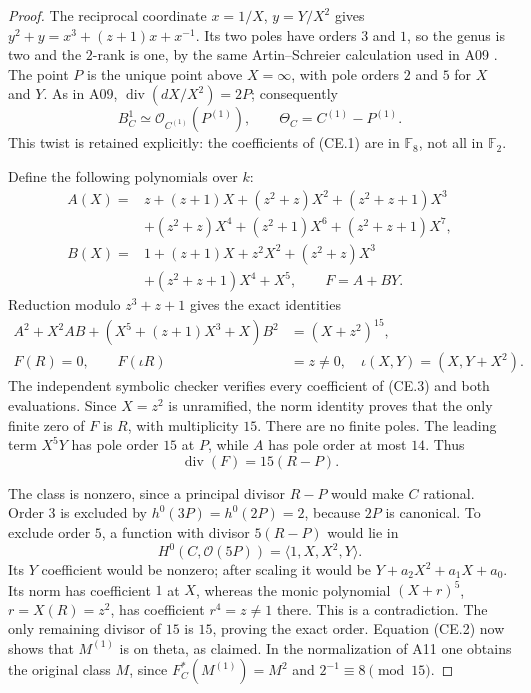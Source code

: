 \documentclass[11pt,a4paper]{article}
\begin{document}
\begin{proof}
The reciprocal coordinate $x=1/X$, $y=Y/X^2$ gives
$y^2+y=x^3+(z+1)x+x^{-1}$. Its two poles have orders $3$ and $1$,
so the genus is two and the $2$-rank is one, by the same
Artin--Schreier calculation used in A09
\cite[Lemma~2.6]{PriesZhu2012}. The point $P$ is the unique point
above $X=\infty$, with pole orders $2$ and $5$ for $X$ and $Y$.
As in A09, $\operatorname{div}(dX/X^2)=2P$; consequently
\[
 B^1_C\simeq\mathcal O_{C^{(1)}}(P^{(1)}),\qquad
 \Theta_C=C^{(1)}-P^{(1)}.
 \tag{CE.2}
\]
This twist is retained explicitly: the coefficients of (CE.1) are
in $\mathbb F_8$, not all in $\mathbb F_2$.

Define the following polynomials over $k$:
\begin{align*}
 A(X)={}&z+(z+1)X+(z^2+z)X^2+(z^2+z+1)X^3\\
        &+(z^2+z)X^4+(z^2+1)X^6+(z^2+z+1)X^7,\\
 B(X)={}&1+(z+1)X+z^2X^2+(z^2+z)X^3\\
        &+(z^2+z+1)X^4+X^5,\qquad F=A+BY.
\end{align*}
Reduction modulo $z^3+z+1$ gives the exact identities
\begin{align}
 A^2+X^2AB+(X^5+(z+1)X^3+X)B^2&=(X+z^2)^{15},
 \tag{CE.3}\\
 F(R)=0,\qquad F(\iota R)&=z\ne0,
 \quad\iota(X,Y)=(X,Y+X^2).
 \tag{CE.4}
\end{align}
The independent symbolic checker verifies every coefficient of
(CE.3) and both evaluations. Since $X=z^2$ is unramified, the norm
identity proves that the only finite zero of $F$ is $R$, with
multiplicity $15$. There are no finite poles. The leading term
$X^5Y$ has pole order $15$ at $P$, while $A$ has pole order at
most $14$. Thus
\[
                       \operatorname{div}(F)=15(R-P).
 \tag{CE.5}
\]

The class is nonzero, since a principal divisor $R-P$ would make
$C$ rational. Order $3$ is excluded by
$h^0(3P)=h^0(2P)=2$, because $2P$ is canonical. To exclude order
$5$, a function with divisor $5(R-P)$ would lie in
\[
 H^0(C,\mathcal O(5P))=\langle1,X,X^2,Y\rangle.
\]
Its $Y$ coefficient would be nonzero; after scaling it would be
$Y+a_2X^2+a_1X+a_0$. Its norm has coefficient $1$ at $X$, whereas
the monic polynomial $(X+r)^5$, $r=X(R)=z^2$, has coefficient
$r^4=z\ne1$ there. This is a contradiction. The only remaining
divisor of $15$ is $15$, proving the exact order. Equation (CE.2)
now shows that $M^{(1)}$ is on theta, as claimed. In the normalization
of A11 one obtains the original class $M$, since
$F_C^*(M^{(1)})=M^2$ and $2^{-1}\equiv8\pmod{15}$.


\end{proof}
\end{document}
